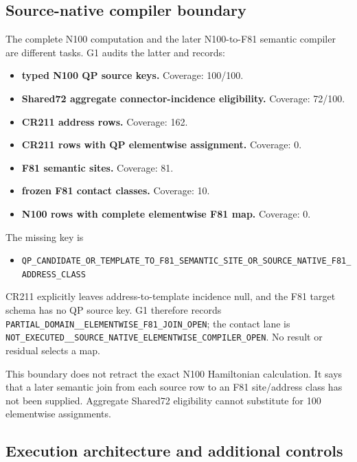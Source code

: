 \subsection{Source-native compiler
boundary}\label{viii-ch01-source-native-compiler-boundary}

The complete N100 computation and the later N100-to-F81 semantic
compiler are different tasks. G1 audits the latter and records:

\begin{itemize}
\tightlist
\item
  \textbf{typed N100 QP source keys.} Coverage: 100/100.
\item
  \textbf{Shared72 aggregate connector-incidence eligibility.} Coverage:
  72/100.
\item
  \textbf{CR211 address rows.} Coverage: 162.
\item
  \textbf{CR211 rows with QP elementwise assignment.} Coverage: 0.
\item
  \textbf{F81 semantic sites.} Coverage: 81.
\item
  \textbf{frozen F81 contact classes.} Coverage: 10.
\item
  \textbf{N100 rows with complete elementwise F81 map.} Coverage: 0.
\end{itemize}

The missing key is

\begin{itemize}
\tightlist
\item
  \nolinkurl{QP_CANDIDATE_OR_TEMPLATE_TO_F81_SEMANTIC_SITE_OR_SOURCE_NATIVE_F81_ADDRESS_CLASS}
\end{itemize}

CR211 explicitly leaves address-to-template incidence null, and the F81
target schema has no QP source key. G1 therefore records
\nolinkurl{PARTIAL_DOMAIN__ELEMENTWISE_F81_JOIN_OPEN}; the contact
lane is
\nolinkurl{NOT_EXECUTED__SOURCE_NATIVE_ELEMENTWISE_COMPILER_OPEN}.
No result or residual selects a map.

This boundary does not retract the exact N100 Hamiltonian calculation.
It says that a later semantic join from each source row to an F81
site/address class has not been supplied. Aggregate Shared72 eligibility
cannot substitute for 100 elementwise assignments.

\subsection{Execution architecture and additional controls}\label{viii-ch01-execution-architecture-and-controls}

